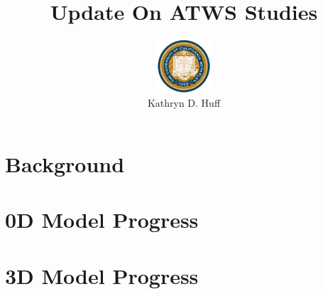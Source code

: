 \documentclass[serif]{beamer}
\begin{document}
\title{Update On ATWS Studies}
\author[Kathryn D. Huff]{\includegraphics[height=2cm]{bk}\\Kathryn D. Huff}
\maketitle

\section{Background}


\section{0D Model Progress}


\section{3D Model Progress}

\end{document}
